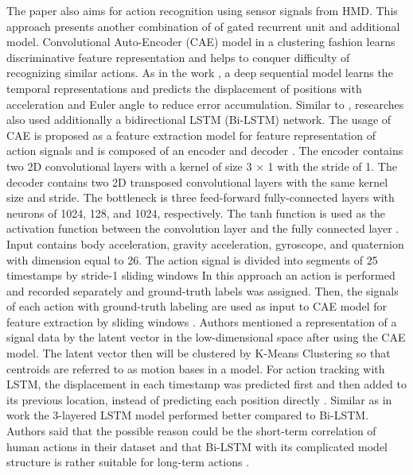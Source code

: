 The paper \cite{action_recognition} also aims for action recognition using sensor signals from HMD. This approach presents another combination of of gated recurrent unit and additional model. Convolutional Auto-Encoder (CAE) model in a clustering fashion learns discriminative feature representation and helps to conquer difficulty of recognizing similar actions. As in the work \cite{6DoF_Tracking}, a deep sequential model learns the temporal representations and predicts the displacement of positions with acceleration and Euler angle to reduce error accumulation. Similar to \cite{6DoF_Tracking}, researches also used additionally a bidirectional LSTM (Bi-LSTM) network. The usage of CAE is proposed as a feature extraction model for feature representation of action signals and is composed of an encoder and decoder \cite{action_recognition}. The encoder contains two 2D convolutional layers with a kernel of size 3 × 1 with the stride of 1. The decoder contains two 2D transposed convolutional layers with the same kernel size and stride. The bottleneck is three feed-forward fully-connected layers with neurons of 1024, 128, and 1024, respectively. The tanh function is used as the activation function between the convolution layer and the fully connected layer \cite{action_recognition}. Input contains body acceleration, gravity acceleration, gyroscope, and quaternion with dimension equal to 26. The action signal is divided into segments of 25 timestamps by stride-1 sliding windows In this approach an action is performed and recorded separately and ground-truth labels was assigned. Then, the signals of each action with ground-truth labeling are used as input to CAE model for feature extraction by sliding windows \cite{action_recognition}. Authors mentioned a representation of a signal data by the latent vector in the low-dimensional space after using the CAE model. The latent vector then will be clustered by K-Means Clustering so that centroids are referred to as motion bases in a model. For action tracking with LSTM, the displacement in each timestamp was predicted first and then added to its previous location, instead of predicting each position directly \cite{action_recognition}. Similar as in work \cite{6DoF_Tracking} the 3-layered LSTM model performed better compared to Bi-LSTM. Authors said that the possible reason could be the short-term correlation of human actions in their dataset and that Bi-LSTM with its complicated model structure is rather suitable for long-term actions \cite{action_recognition}.\\
